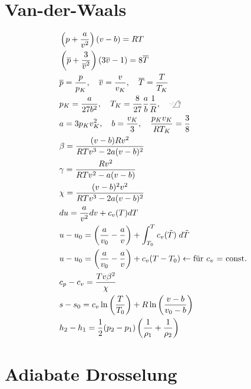 \documentclass[twocolumn]{article}
\begin{document}
\section{Van-der-Waals}
\begin{align*}
	&\left(p + \frac{a}{v^2}\right)(v-b) = RT 
	\\
	&\left(\overline{p} + \frac{3}{\overline{v}^2}\right)(3\overline{v}-1) = 8\overline{T} 
	\\
	&\overline{p} = \frac{p}{p_K}, \quad \overline{v} = \frac{v}{v_K}, \quad \overline{T} = \frac{T}{T_K} 
	\\
	&p_K = \frac{a}{27b^2}, \quad T_K = \frac{8}{27}\frac{a}{b}\frac{1}{R}, \quad \xrightswishingghost{} 
	\\
	&a=3p_Kv^2_K, \quad b =\frac{v_K}{3}, \quad \frac{p_Kv_K}{RT_K} = \frac{3}{8} 
	\\
	&\beta = \frac{(v-b)Rv^2}{RTv^3 - 2a(v-b)^2} 
	\\ 
	&\gamma = \frac{Rv^2}{RTv^2 - a(v-b)} 
	\\
	&\chi = \frac{(v-b)^2v^2}{RTv^3 - 2a(v-b)^2} 
	\\
	& du = \frac{a}{v^2}dv + c_v(T)dT 
	\\
	&u-u_0 = \left( \frac{a}{v_0} - \frac{a}{v} \right) + \int_{T_0}^{T} c_v(\tilde{T})\; d\tilde{T} 
	\\
	& u - u_0 = \left(\frac{a}{v_0} - \frac{a}{v} \right) + c_v(T-T_0) \leftarrow \text{für $c_v$ = const.} 
	\\
	&c_p - c_v = \frac{Tv\beta^2}{\chi} 
	\\
	& s- s_0 = c_v \ln \left( \frac{T}{T_0} \right) + R \ln \left(\frac{v-b}{v_0 - b} \right)
	\\
	& h_2 - h_1 = \frac{1}{2}(p_2 - p_1) \left( \frac{1}{\rho_1} + \frac{1}{\rho_2}\right)
	\\
\end{align*}

%                                           
\section{Adiabate Drosselung}
\end{document}
